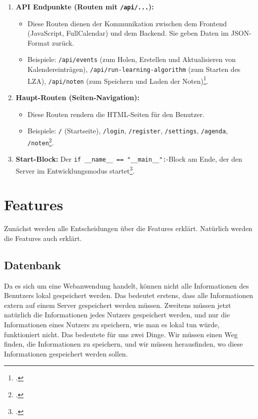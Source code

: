\documentclass[12pt,a4paper]{report}
\begin{document}
\begin{enumerate}
\begin{itemize}
    \end{itemize}
    \item \textbf{API Endpunkte (Routen mit \texttt{/api/...}):}
    \begin{itemize}
        \item Diese Routen dienen der Kommunikation zwischen dem Frontend (JavaScript, FullCalendar) und dem Backend. Sie geben Daten im JSON-Format zurück.
        \item Beispiele: \texttt{/api/events} (zum Holen, Erstellen und Aktualisieren von Kalendereinträgen), \texttt{/api/run-learning-algorithm} (zum Starten des LZA), \texttt{/api/noten} (zum Speichern und Laden der Noten)\footcite{app.py}.
    \end{itemize}
    \item \textbf{Haupt-Routen (Seiten-Navigation):}
    \begin{itemize}
        \item Diese Routen rendern die HTML-Seiten für den Benutzer.
        \item Beispiele: \texttt{/} (Startseite), \texttt{/login}, \texttt{/register}, \texttt{/settings}, \texttt{/agenda}, \texttt{/noten}\footcite{app.py}.
    \end{itemize}
    \item \textbf{Start-Block:} Der \texttt{if \_\_name\_\_ == "\_\_main\_\_":}-Block am Ende, der den Server im Entwicklungsmodus startet\footcite{app.py}.
\end{enumerate}

\section{Features}
Zunächst werden alle Entscheidungen über die Features erklärt. Natürlich werden die Features auch erklärt.

\subsection{Datenbank}
Da es sich um eine Webanwendung handelt, können nicht alle Informationen des Benutzers lokal gespeichert werden. Das bedeutet erstens, dass alle Informationen extern auf einem Server gespeichert werden müssen. Zweitens müssen jetzt natürlich die Informationen jedes Nutzers gespeichert werden, und nur die Informationen eines Nutzers zu speichern, wie man es lokal tun würde, funktioniert nicht. Das bedeutete für uns zwei Dinge. Wir müssen einen Weg finden, die Informationen zu speichern, und wir müssen herausfinden, wo diese Informationen gespeichert werden sollen.
\end{document}
